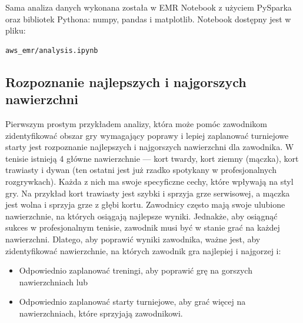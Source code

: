 \documentclass[12pt, a4paper]{article}
\begin{document}
Sama analiza danych wykonana została w EMR Notebook z użyciem PySparka oraz bibliotek Pythona: numpy, pandas i matplotlib. Notebook dostępny jest w pliku:
\begin{verbatim}
aws_emr/analysis.ipynb
\end{verbatim}




\subsection{Rozpoznanie najlepszych i najgorszych nawierzchni}
Pierwszym prostym przykładem analizy, która może pomóc zawodnikom zidentyfikować obszar gry wymagający poprawy i lepiej zaplanować turniejowe starty jest rozpoznanie najlepszych i najgorszych nawierzchni dla zawodnika. W tenisie istnieją 4 główne nawierzchnie --- kort twardy, kort ziemny (mączka), kort trawiasty i dywan (ten ostatni jest już rzadko spotykany w profesjonalnych rozgrywkach). Każda z nich ma swoje specyficzne cechy, które wpływają na styl gry. Na przykład kort trawiasty jest szybki i sprzyja grze serwisowej, a mączka jest wolna i sprzyja grze z głębi kortu. Zawodnicy często mają swoje ulubione nawierzchnie, na których osiągają najlepsze wyniki. Jednakże, aby osiągnąć sukces w profesjonalnym tenisie, zawodnik musi być w stanie grać na każdej nawierzchni. Dlatego, aby poprawić wyniki zawodnika, ważne jest, aby zidentyfikować nawierzchnie, na których zawodnik gra najlepiej i najgorzej i:
\begin{itemize}
    \item Odpowiednio zaplanować treningi, aby poprawić grę na gorszych nawierzchniach lub
    \item Odpowiednio zaplanować starty turniejowe, aby grać więcej na nawierzchniach, które sprzyjają zawodnikowi.
\end{itemize}
\end{document}
